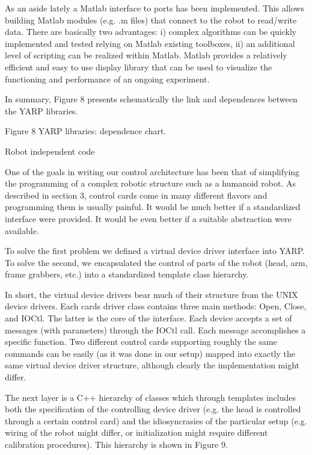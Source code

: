 As an aside lately a Matlab interface to ports has been
implemented. This allows building Matlab modules (e.g. .m files) that
connect to the robot to read/write data. There are basically two
advantages: i) complex algorithms can be quickly implemented and
tested relying on Matlab existing toolboxes, ii) an additional level
of scripting can be realized within Matlab. Matlab provides a
relatively efficient and easy to use display library that can be used
to visualize the functioning and performance of an ongoing experiment.

In summary, Figure 8 presents schematically the link and dependences
between the YARP libraries.

Figure 8 YARP libraries: dependence chart.

Robot independent code

One of the goals in writing our control architecture has been that of
simplifying the programming of a complex robotic structure such as a
humanoid robot. As described in section 3, control cards come in many
different flavors and programming them is usually painful. It would be
much better if a standardized interface were provided. It would be
even better if a suitable abstraction were available.

To solve the first problem we defined a virtual device driver
interface into YARP. To solve the second, we encapsulated the control
of parts of the robot (head, arm, frame grabbers, etc.) into a
standardized template class hierarchy.

In short, the virtual device drivers bear much of their structure from
the UNIX device drivers. Each cards driver class contains three main
methods: Open, Close, and IOCtl. The latter is the core of the
interface. Each device accepts a set of messages (with parameters)
through the IOCtl call. Each message accomplishes a specific
function. Two different control cards supporting roughly the same
commands can be easily (as it was done in our setup) mapped into
exactly the same virtual device driver structure, although clearly the
implementation might differ.

The next layer is a C++ hierarchy of classes which through templates
includes both the specification of the controlling device driver
(e.g. the head is controlled through a certain control card) and the
idiosyncrasies of the particular setup (e.g. wiring of the robot might
differ, or initialization might require different calibration
procedures). This hierarchy is shown in Figure 9.


